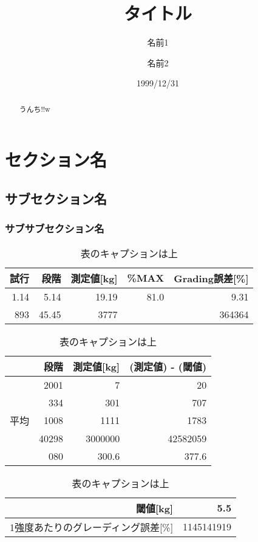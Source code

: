 \documentclass[dvipdfmx]{article}
\title{\vspace{-10mm}タイトル}
\author {名前1 \and 名前2}
\date {1999/12/31}
\begin{document}
    \maketitle

    \vspace{-15mm}
    \begin{abstract}
        うんち!!w
        \vspace{3mm}
    \end{abstract}

    \vspace{1mm}

    \section{セクション名}\label{seq:s1}
    \subsection{サブセクション名}
    \subsubsection{サブサブセクション名}
    \begin{table}[H]%
        \begin{flushleft}
            \caption{表のキャプションは上\label{tb:t1}}
            \begin{tabular}{|r|r|r|r|r|}  \hline
            試行 & 段階 & 測定値[kg] & \%MAX & Grading誤差[\%] \\ \hline \hline
            1.14 & 5.14 & 19.19 & 81.0 & 9.31 \\ \hline
            893 & 45.45 & 3777 &  & 364364 \\ \hline
            \end{tabular}
            \begin{tabular}{|r|r|r|r|} \hline \hline
            & 段階 & 測定値[kg] & (測定値) - (閾値) \\ \hline \hline
            & 2001 & 7 & 20 \\ \cline{2-4}
            & 334 & 301 & 707 \\ \cline{2-4}
            平均 & 1008 & 1111 & 1783 \\ \cline{2-4}
            & 40298 & 3000000 & 42582059 \\ \cline{2-4}
            & 080 & 300.6 & 377.6 \\ \hline
            \end{tabular}
            \begin{tabular}{|r|r|} \hline \hline
            閾値[kg] & 5.5 \\ \hline \hline
            1強度あたりのグレーディング誤差[\%] & 1145141919 \\ \hline
            \end{tabular}
        \end{flushleft}
    \end{table}
\end{document}
